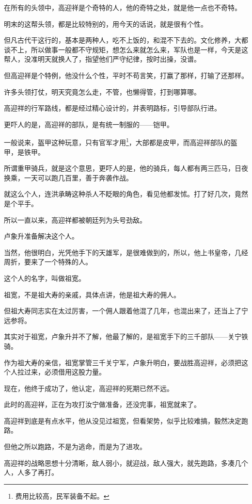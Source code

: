 \begin{multicols}{\theparacolNo}
在所有的头领中，高迎祥是个奇特的人，他的奇特之处，就是他一点也不奇特。

明末的这帮头领，都是比较特别的，用今天的话说，就是很有个性。

但凡古代干这行的，基本是两种人，吃不上饭的，和混不下去的。文化修养，大都谈不上，所以做事一般都不守规矩，想怎么来就怎么来，军队也是一样，今天是这帮人，没准明天就换人了，指望他们严守纪律，按时出操，没谱。

但高迎祥是个特例，他没什么个性，平时不苟言笑，打赢了那样，打输了还那样。

许多头领打仗，明天究竟怎么走，不管，也懒得管，打到哪算哪。

高迎祥的行军路线，都是经过精心设计的，并表明路标，引导部队行进。

更吓人的是，高迎祥的部队，是有统一制服的——铠甲。

一般说来，盔甲这种玩意，只有官军才用\footnote{费用比较高，民军装备不起。}，大部都是皮甲，而高迎祥部队的盔甲，是铁甲。

所谓重甲骑兵，就是这个意思，更吓人的是，他的骑兵，每人都有两三匹马，日夜换乘，一天可以跑几百里，善于奔袭作战。

就这么个人，连洪承畴这种杀人不眨眼的角色，看见他都发怵。打了好几次，竟然是个平手。

所以一直以来，高迎祥都被朝廷列为头号劲敌。

卢象升准备解决这个人。

当然，他很明白，光凭他手下的天雄军，是很难做到的，所以，他上书皇帝，几经周折，要来了一个特殊的人。

这个人的名字，叫做祖宽。

祖宽，不是祖大寿的亲戚，具体点讲，他是祖大寿的佣人。

但祖大寿同志实在太过厉害，一个佣人跟着他混了几年，也混出来了，还当上了宁远参将。

其实对于祖宽，卢象升并不了解，他最了解的，是祖宽手下的三千部队——关宁铁骑。

作为祖大寿的亲信，祖宽掌管三千关宁军，卢象升明白，要战胜高迎祥，必须把这个人拉过来，必须借用这股力量。

现在，他终于成功了，他认定，高迎祥的死期已然不远。

此时的高迎祥，正在为攻打汝宁做准备，还没完事，祖宽就来了。

高迎祥到底是有点水平，他从没见过祖宽，但看架势，似乎比较难搞，毅然决定跑路。

但他之所以跑路，不是为逃命，而是为了进攻。

高迎祥的战略思想十分清晰，敌人弱小，就迎战，敌人强大，就先跑路，多凑几个人，人多了再打。


\end{multicols}
